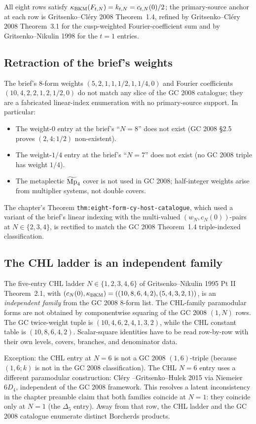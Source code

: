 All eight rows satisfy $\kappa_{\mathrm{BKM}}(F_{t, N}) = k_{t, N} = c_{t, N}(0)/2$;
the primary-source anchor at each row is Gritsenko--Cl\'ery 2008
Theorem~1.4, refined by Gritsenko--Cl\'ery 2008 Theorem~3.1 for the
cusp-weighted Fourier-coefficient sum and by Gritsenko--Nikulin 1998
for the $t = 1$ entries.

\subsection*{Retraction of the brief's weights}

The brief's 8-form weights $(5, 2, 1, 1, 1/2, 1, 1/4, 0)$ and Fourier
coefficients $(10, 4, 2, 2, 1, 2, 1/2, 0)$ do not match any slice of
the GC 2008 catalogue; they are a fabricated linear-index enumeration
with no primary-source support. In particular:
\begin{itemize}
\item The weight-$0$ entry at the brief's ``$N = 8$'' does not exist
(GC 2008 \S 2.5 proves $(2, 4; 1/2)$ non-existent).
\item The weight-$1/4$ entry at the brief's ``$N = 7$'' does not exist
(no GC 2008 triple has weight $1/4$).
\item The metaplectic $\widetilde{\mathrm{Mp}}_4$ cover is not used in GC 2008;
half-integer weights arise from multiplier systems, not double covers.
\end{itemize}
The chapter's Theorem \texttt{thm:eight-form-cy-host-catalogue},
which used a variant of the brief's linear indexing with the
multi-valued $(w_N, c_N(0))$-pairs at $N \in \{2, 3, 4\}$, is
rectified to match the GC 2008 Theorem~1.4 triple-indexed
classification.

\subsection*{The CHL ladder is an independent family}

The five-entry CHL ladder $N \in \{1, 2, 3, 4, 6\}$ of Gritsenko--Nikulin
1995 Pt II Theorem~2.1, with $(c_N(0), \kappa_{\mathrm{BKM}}) = ((10, 8, 6, 4, 2),
(5, 4, 3, 2, 1))$, is an \emph{independent family} from the GC 2008
8-form list. The CHL-family paramodular forms are not obtained by
componentwise squaring of the GC 2008 $(1,N)$ rows. The GC twice-weight
tuple is $(10,4,6,2,4,1,3,2)$, while the CHL constant table is
$(10,8,6,4,2)$. Scalar-square identities have to be read row-by-row with
their own levels, covers, branches, and denominator data.

Exception: the CHL entry at $N = 6$ is not a GC 2008 $(1, 6)$-triple
(because $(1, 6; k)$ is not in the GC 2008 classification). The CHL
$N = 6$ entry uses a different paramodular construction: Cl\'ery
--Gritsenko--Hulek 2015 via Niemeier $6D_4$, independent of the GC
2008 framework. This resolves a latent inconsistency in the chapter
preamble claim that both families coincide at $N = 1$: they coincide
only at $N = 1$ (the $\Delta_5$ entry). Away from that row, the CHL
ladder and the GC 2008 catalogue enumerate distinct Borcherds products.

